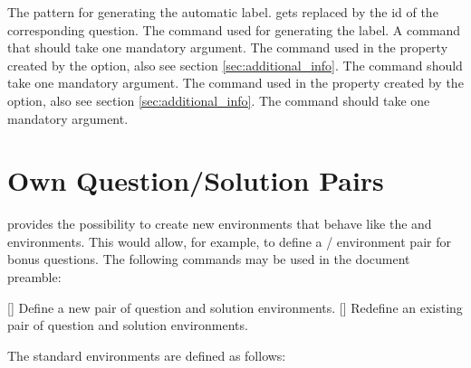 \documentclass[load-preamble+]{cnltx-doc}
\begin{document}
\begin{options}
    The pattern for generating the automatic label.   gets replaced
    by the \ac{id} of the corresponding question.
    The command used for generating the label.  A command that should take one
    mandatory argument.
    The command used in the  property created by the
     option, also see section \ref{sec:additional_info}.
    The command should take one mandatory argument.
    The command used in the  property created by the
     option, also see section \ref{sec:additional_info}.
    The command should take one mandatory argument.
\end{options}

\section{Own Question/Solution Pairs}
\ExSheets{} provides the possibility to create new
environments that behave like the  and 
environments.  This would allow, for example, to define a
/ environment pair for bonus questions.  The
following commands may be used in the document preamble:
\begin{commands}
  []
    Define a new pair of question and solution environments.
  []
    Redefine an existing pair of question and solution environments.
\end{commands}
The standard environments are defined as follows:
\begin{sourcecode}
\end{sourcecode}
\end{document}
